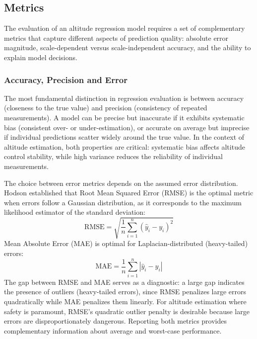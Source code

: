\subsection{Metrics}

The evaluation of an altitude regression model requires a set of complementary metrics that capture different aspects of prediction quality: absolute error magnitude, scale-dependent versus scale-independent accuracy, and the ability to explain model decisions.

    \subsubsection{Accuracy, Precision and Error}

    The most fundamental distinction in regression evaluation is between accuracy (closeness to the true value) and precision (consistency of repeated measurements). A model can be precise but inaccurate if it exhibits systematic bias (consistent over- or under-estimation), or accurate on average but imprecise if individual predictions scatter widely around the true value. In the context of altitude estimation, both properties are critical: systematic bias affects altitude control stability, while high variance reduces the reliability of individual measurements.

    The choice between error metrics depends on the assumed error distribution. Hodson \cite{Hodson2022} established that Root Mean Squared Error (RMSE) is the optimal metric when errors follow a Gaussian distribution, as it corresponds to the maximum likelihood estimator of the standard deviation:
    \begin{equation}
        \mathrm{RMSE} = \sqrt{\frac{1}{n} \sum_{i=1}^{n} (\hat{y}_i - y_i)^2}
        \label{eq:rmse}
    \end{equation}
    Mean Absolute Error (MAE) is optimal for Laplacian-distributed (heavy-tailed) errors:
    \begin{equation}
        \mathrm{MAE} = \frac{1}{n} \sum_{i=1}^{n} |\hat{y}_i - y_i|
        \label{eq:mae}
    \end{equation}
    The gap between RMSE and MAE serves as a diagnostic: a large gap indicates the presence of outliers (heavy-tailed errors), since RMSE penalizes large errors quadratically while MAE penalizes them linearly. For altitude estimation where safety is paramount, RMSE's quadratic outlier penalty is desirable because large errors are disproportionately dangerous. Reporting both metrics provides complementary information about average and worst-case performance.

